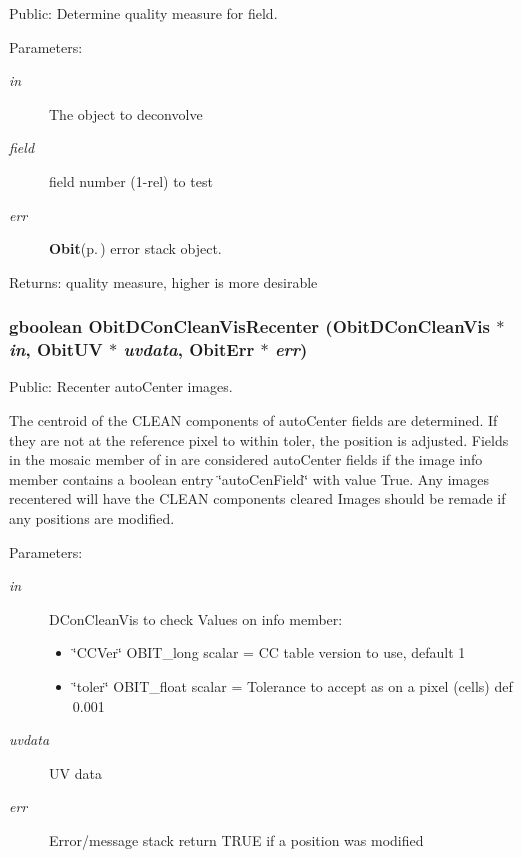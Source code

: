 Public: Determine quality measure for field. 

\begin{Desc}
\item[Parameters:]
\begin{description}
\item[{\em in}]The object to deconvolve \item[{\em field}]field number (1-rel) to test \item[{\em err}]{\bf Obit}{\rm (p.\,\pageref{structObit})} error stack object. \end{description}
\end{Desc}
\begin{Desc}
\item[Returns:]quality measure, higher is more desirable \end{Desc}
\subsubsection{\setlength{\rightskip}{0pt plus 5cm}gboolean Obit\-DCon\-Clean\-Vis\-Recenter ({\bf Obit\-DCon\-Clean\-Vis} $\ast$ {\em in}, {\bf Obit\-UV} $\ast$ {\em uvdata}, {\bf Obit\-Err} $\ast$ {\em err})}\label{ObitDConCleanVis_8c_a26}


Public: Recenter auto\-Center images. 

The centroid of the CLEAN components of auto\-Center fields are determined. If they are not at the reference pixel to within toler, the position is adjusted. Fields in the mosaic member of in are considered auto\-Center fields if the image info member contains a boolean entry \char`\"{}auto\-Cen\-Field\char`\"{} with value True. Any images recentered will have the CLEAN components cleared Images should be remade if any positions are modified. \begin{Desc}
\item[Parameters:]
\begin{description}
\item[{\em in}]DCon\-Clean\-Vis to check Values on info member: \begin{itemize}
\item \char`\"{}CCVer\char`\"{} OBIT\_\-long scalar = CC table version to use, default 1 \item \char`\"{}toler\char`\"{} OBIT\_\-float scalar = Tolerance to accept as on a pixel (cells) def 0.001 \end{itemize}
\item[{\em uvdata}]UV data \item[{\em err}]Error/message stack return TRUE if a position was modified \end{description}
\end{Desc}
